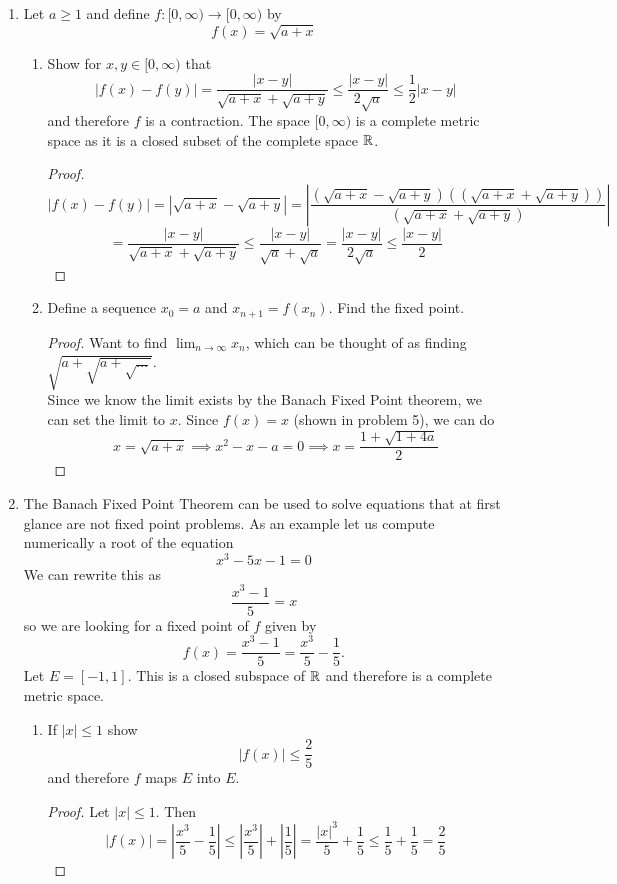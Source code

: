 \documentclass[14pt]{extarticle}
\begin{document}
\begin{enumerate}
		\item Let $a \geq 1$ and define $f: [0,\infty) \rightarrow [0,\infty)$ by
		\[f(x) = \sqrt{a+x}\]
		\begin{enumerate}
			\item Show for $x,y \in [0,\infty)$ that 
			\[|f(x) - f(y)| = \frac{|x-y|}{\sqrt{a+x}+\sqrt{a+y}} \leq \frac{|x-y|}{2\sqrt{a}} \leq \frac{1}{2}|x-y|\]
			and therefore $f$ is a contraction. The space $[0,\infty)$ is a complete metric space as it is a closed subset of the complete space $\mathbb{R}$.
			\begin{proof}
				\[|f(x)-f(y)| = |\sqrt{a+x}-\sqrt{a+y}| = \left|\frac{(\sqrt{a+x}-\sqrt{a+y})((\sqrt{a+x}+\sqrt{a+y}))}{(\sqrt{a+x}+\sqrt{a+y})}\right|\]
				\[=\frac{|x-y|}{\sqrt{a+x}+\sqrt{a+y}} \leq \frac{|x-y|}{\sqrt{a}+\sqrt{a}} = \frac{|x-y|}{2\sqrt{a}} \leq \frac{|x-y|}{2}\]
			\end{proof}
			
			\item Define a sequence $x_0 = a$ and $x_{n+1} = f(x_n)$. Find the fixed point.
			\begin{proof}
				Want to find $\lim_{n\rightarrow\infty} x_n$, which can be thought of as finding $\sqrt{a+\sqrt{a+\sqrt{\ldots}}}$.\\
				Since we know the limit exists by the Banach Fixed Point theorem, we can set the limit to $x$. Since $f(x) = x$ (shown in problem 5), we can do
				\[x = \sqrt{a+x} \implies x^2 - x - a = 0 \implies x = \frac{1+\sqrt{1+4a}}{2}\]
			\end{proof}
		\end{enumerate}
		
		\item The Banach Fixed Point Theorem can be used to solve equations that at first glance are not fixed point problems. As an example let us compute numerically a root of the equation
		\[x^3-5x-1=0\]
		We can rewrite this as 
		\[\frac{x^3-1}{5} = x\]
		so we are looking for a fixed point of $f$ given by 
		\[f(x) = \frac{x^3-1}{5} = \frac{x^3}{5} - \frac{1}{5}.\]
		Let $E = [-1,1]$. This is a closed subspace of $\mathbb{R}$ and therefore is a complete metric space.
		\begin{enumerate}
			\item If $|x| \leq 1$ show
			\[|f(x)| \leq \frac{2}{5}\]
			and therefore $f$ maps $E$ into $E$.
			\begin{proof}
				Let $|x|\leq1$. Then $$|f(x)| = \left|\frac{x^3}{5} - \frac{1}{5}\right| \leq \left|\frac{x^3}{5}\right| + \left|\frac{1}{5}\right| = \frac{|x|^3}{5} + \frac{1}{5} \leq \frac{1}{5} + \frac{1}{5} = \frac{2}{5}$$
			\end{proof}
			

\end{enumerate}
\end{enumerate}
\end{document}
